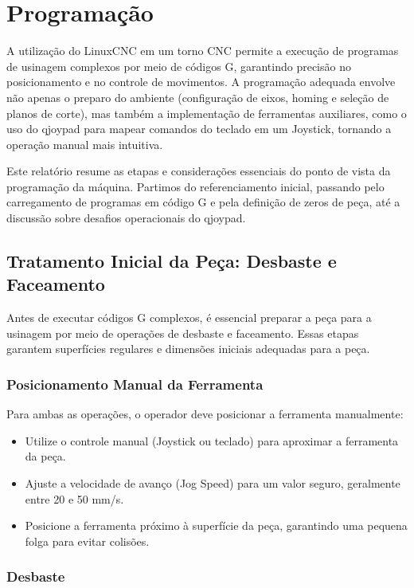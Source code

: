 \chapter{Programação}

A utilização do LinuxCNC em um torno CNC permite a execução de programas de usinagem complexos por meio de códigos G, garantindo precisão no posicionamento e no controle de movimentos. A programação adequada envolve não apenas o preparo do ambiente (configuração de eixos, homing e seleção de planos de corte), mas também a implementação de ferramentas auxiliares, como o uso do qjoypad para mapear comandos do teclado em um Joystick, tornando a operação manual mais intuitiva.

Este relatório resume as etapas e considerações essenciais do ponto de vista da programação da máquina. Partimos do referenciamento inicial, passando pelo carregamento de programas em código G e pela definição de zeros de peça, até a discussão sobre desafios operacionais do qjoypad.

\section{Tratamento Inicial da Peça: Desbaste e Faceamento}

Antes de executar códigos G complexos, é essencial preparar a peça para a usinagem por meio de operações de desbaste e faceamento. Essas etapas garantem superfícies regulares e dimensões iniciais adequadas para a peça.

\subsection{Posicionamento Manual da Ferramenta}

Para ambas as operações, o operador deve posicionar a ferramenta manualmente:

\begin{itemize}
    \item Utilize o controle manual (Joystick ou teclado) para aproximar a ferramenta da peça.
    \item Ajuste a velocidade de avanço (Jog Speed) para um valor seguro, geralmente entre 20 e 50 mm/s.
    \item Posicione a ferramenta próximo à superfície da peça, garantindo uma pequena folga para evitar colisões.
\end{itemize}

\subsection{Desbaste}

